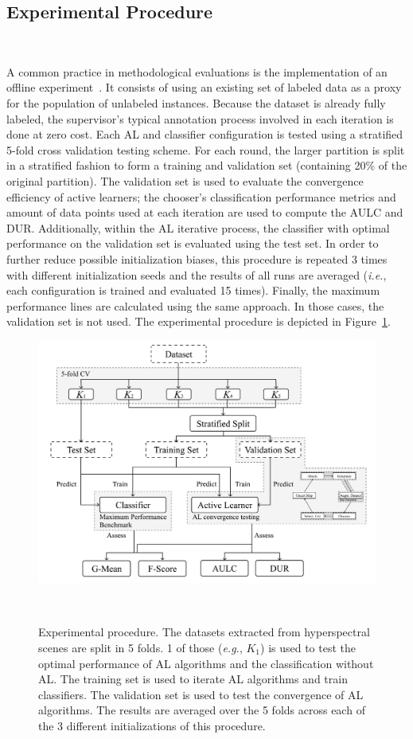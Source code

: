 \documentclass[remotesensing,article,submit,moreauthors,pdftex]{Definitions/mdpi}
\begin{document}
\begin{paracol}{2}
\subsection{Experimental Procedure}~\label{sec:experimental_procedure}

A common practice in methodological evaluations is the implementation of an
offline experiment~\cite{Kagy2019}. It consists of using an existing set of
labeled data as a proxy for the population of unlabeled instances. Because the
dataset is already fully labeled, the supervisor's typical annotation process
involved in each iteration is done at zero cost. Each AL and classifier
configuration is tested using a stratified 5-fold cross validation testing
scheme. For each round, the larger partition is split in a stratified fashion
to form a training and validation set (containing 20\% of the original
partition). The validation set is used to evaluate the convergence efficiency
of active learners; the chooser's classification performance metrics and
amount of data points used at each iteration are used to compute the AULC and
DUR\@. Additionally, within the AL iterative process, the classifier with
optimal performance on the validation set is evaluated using the test set. In
order to further reduce possible initialization biases, this procedure is
repeated 3 times with different initialization seeds and the results of all
runs are averaged (\textit{i.e.}, each configuration is trained and evaluated
15 times). Finally, the maximum performance lines are calculated using the
same approach. In those cases, the validation set is not used. The
experimental procedure is depicted in Figure~\ref{fig:experiment_pipeline}.

\end{paracol}
\begin{figure}[H]
	\centering
	\includegraphics[width=.75\linewidth]{../analysis/experiment_pipeline}
    \caption{
        Experimental procedure. The datasets extracted from hyperspectral
        scenes are split in 5 folds. 1 of those (\textit{e.g.}, $K_1$) is used
        to test the optimal performance of AL algorithms and the
        classification without AL. The training set is used to iterate AL
        algorithms and train classifiers. The validation set is used to test
        the convergence of AL algorithms. The results are averaged over the 5
        folds across each of the 3 different initializations of this
        procedure.
    }~\label{fig:experiment_pipeline}
\end{figure}
\end{document}
